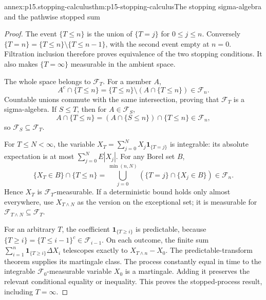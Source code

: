 \begin{annexitem}{annex:p15.stopping-calculus}{thm:p15-stopping-calculus}{The stopping sigma-algebra and the pathwise stopped sum}
\begin{proof}
The event \(\{T\leq n\}\) is the union of \(\{T=j\}\) for \(0\leq j\leq n\).
Conversely \(\{T=n\}=\{T\leq n\}\setminus\{T\leq n-1\}\),
with the second event empty at \(n=0\).
Filtration inclusion therefore proves equivalence of the two stopping
conditions. It also makes \(\{T=\infty\}\) measurable in the ambient space.

The whole space belongs to \(\mathcal F_T\).
For a member \(A\),
\[
 A^c\cap\{T\leq n\}
     =\{T\leq n\}\setminus(A\cap\{T\leq n\})\in\mathcal F_n.
\]
Countable unions commute with the same intersection, proving that
\(\mathcal F_T\) is a sigma-algebra.
If \(S\leq T\), then for \(A\in\mathcal F_S\),
\[
 A\cap\{T\leq n\}
       =(A\cap\{S\leq n\})\cap\{T\leq n\}\in\mathcal F_n,
\]
so \(\mathcal F_S\subseteq\mathcal F_T\).

For \(T\leq N<\infty\), the variable
\(X_T=\sum_{j=0}^NX_j\mathbf1_{\{T=j\}}\) is integrable:
its absolute expectation is at most \(\sum_{j=0}^NE|X_j|\).
For any Borel set \(B\),
\[
 \{X_T\in B\}\cap\{T\leq n\}
      =\bigcup_{j=0}^{\min(n,N)}
                     (\{T=j\}\cap\{X_j\in B\})\in\mathcal F_n.
\]
Hence \(X_T\) is \(\mathcal F_T\)-measurable.
If a deterministic bound holds only almost everywhere, use
\(X_{T\wedge N}\) as the version on the exceptional set;
it is measurable for \(\mathcal F_{T\wedge N}\subseteq\mathcal F_T\).

For an arbitrary \(T\), the coefficient \(\mathbf1_{\{T\geq i\}}\)
is predictable, because
\(\{T\geq i\}=\{T\leq i-1\}^c\in\mathcal F_{i-1}\).
On each outcome, the finite sum
\(\sum_{i=1}^n\mathbf1_{\{T\geq i\}}\Delta X_i\)
telescopes exactly to \(X_{T\wedge n}-X_0\).
The predictable-transform theorem supplies its martingale class.
The process constantly equal in time to the integrable
\(\mathcal F_0\)-measurable variable \(X_0\) is a martingale.
Adding it preserves the relevant conditional equality or inequality.
This proves the stopped-process result, including \(T=\infty\).
\end{proof}
\end{annexitem}

